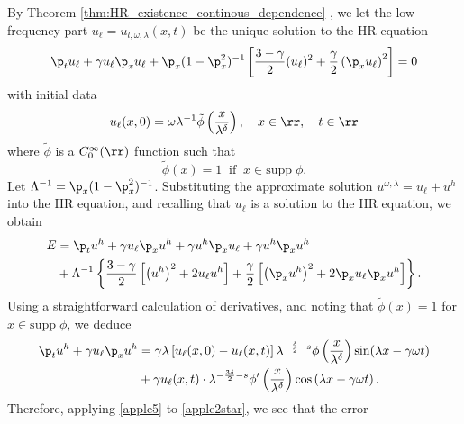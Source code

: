 By Theorem \ref{thm:HR_existence_continous_dependence} ,
we let the low frequency part $u_\ell = u_{l,
\omega, \lambda}(x,t)$ be the unique solution to the HR equation
\begin{equation}
	\p_t u_\ell + \gamma u_\ell \p_x u_\ell + \p_x (1- \p_x^2)^{-1}  \left[
	\frac{3- \gamma}{2}(u_\ell)^2 + \frac{\gamma}{2}\left( \p_x u_\ell
	\right)^2 \right] = 0
	\label{apple1*}
\end{equation}
with initial data
\begin{equation}
	u_\ell(x,0) = \omega \lambda^{-1} \tilde{\phi} \left(
	\frac{x}{\lambda^{\delta}}
	\right), \quad x \in \rr, \quad t \in \rr
	\label{apple1**}
\end{equation}
where $\tilde{\phi}$ is a $C^{\infty}_0(\rr)$ function such that
\begin{equation}
	\label{apple1***}
	\tilde{\phi}(x) = 1 \; \;  \text{if} \; \;
	x \in \text{supp} \; \phi.
\end{equation}
Let $\Lambda^{-1} = \p_x (1 - \p_x^2)^{-1} $. Substituting the
approximate solution $u^{\omega, \lambda} = u_\ell + u^h$ into the HR
equation, and recalling that $u_\ell$ is a solution to the
HR equation, we obtain
\begin{equation}
	\begin{split}
		E 
		& = \p_t u^h + \gamma u_\ell \p_x u^h + \gamma u^h \p_x u_\ell +
		\gamma u^h \p_x u^h
		\\
		& + \Lambda^{-1} \left\{ \frac{3-\gamma}{2}\left[ \left( u^h
		\right)^2 + 2u_\ell u^h
		\right]+ \frac{\gamma}{2}\left[ \left( \p_x u^h \right)^2 + 2
		\p_x u_\ell \p_x u^h\right] \right\}.
		\label{apple2star}
	\end{split}
\end{equation}
Using a straightforward calculation of derivatives, and
noting that $\tilde{\phi} (x) = 1$ for $x \in \text{supp} \;
\phi$,
we deduce
\begin{equation}
	\begin{split}
		\p_t u^h + \gamma u_\ell \p_x u^h 
		& = \gamma \lambda\left[ u_\ell(x,0) - u_\ell(x,t)
		\right]\lambda^{-\frac{\delta}{2}-s} \phi\left(
		\frac{x}{\lambda^\delta}
		\right) \sin(\lambda x - \gamma \omega t)
		\\
		& + \gamma u_\ell(x,t) \cdot \lambda^{-\frac{3\delta}{2}-s}
		\phi'\left( \frac{x}{\lambda^\delta} \right)\cos\left( \lambda
		x - \gamma \omega t
		\right).
						 \label{apple5}
					 \end{split}
				 \end{equation}
				 Therefore, applying \eqref{apple5} to \eqref{apple2star}, we see that the error
